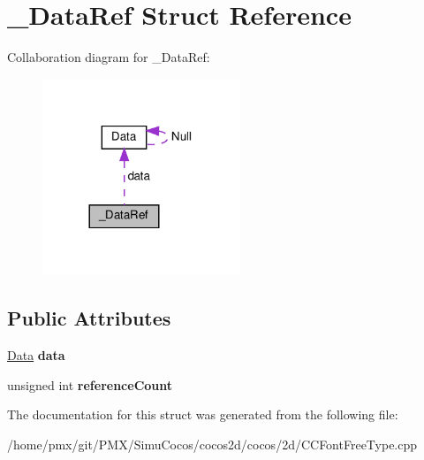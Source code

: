 \hypertarget{struct__DataRef}{}\section{\+\_\+\+Data\+Ref Struct Reference}
\label{struct__DataRef}


Collaboration diagram for \+\_\+\+Data\+Ref\+:
\nopagebreak
\begin{figure}[H]
\begin{center}
\leavevmode
\includegraphics[width=168pt]{struct__DataRef__coll__graph}
\end{center}
\end{figure}
\subsection*{Public Attributes}
\begin{DoxyCompactItemize}
\item 
\mbox{\label{struct__DataRef_ab7accaae6c2372d12839ae78726f793c}} 
\hyperlink{classData}{Data} {\bfseries data}
\item 
\mbox{\label{struct__DataRef_a11c0f374308f3a79e03abb3ee0dc72a1}} 
unsigned int {\bfseries reference\+Count}
\end{DoxyCompactItemize}


The documentation for this struct was generated from the following file\+:\begin{DoxyCompactItemize}
\item 
/home/pmx/git/\+P\+M\+X/\+Simu\+Cocos/cocos2d/cocos/2d/C\+C\+Font\+Free\+Type.\+cpp\end{DoxyCompactItemize}
